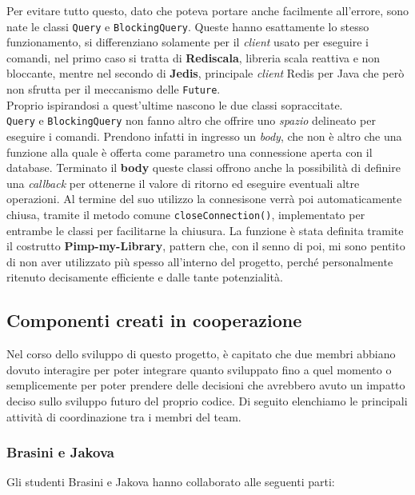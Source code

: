           Per evitare tutto questo, dato che poteva portare anche facilmente all'errore, sono nate le classi \texttt{Query} e \texttt{BlockingQuery}. Queste hanno esattamente lo stesso funzionamento, si differenziano solamente per il \textit{client} usato per eseguire i comandi, nel primo caso si tratta di \textbf{Rediscala}, libreria scala reattiva e non bloccante, mentre nel secondo di \textbf{Jedis}, principale \textit{client} Redis per Java che però non sfrutta per il meccanismo delle \texttt{Future}.
          \\
          Proprio ispirandosi a quest'ultime nascono le due classi sopraccitate. \\
          \texttt{Query} e \texttt{BlockingQuery} non fanno altro che offrire uno \textit{spazio} delineato per eseguire i comandi. Prendono infatti in ingresso un \textit{body}, che non è altro che una funzione alla quale è offerta come parametro una connessione aperta con il database. Terminato il \textbf{body} queste classi offrono anche la possibilità di definire una \textit{callback} per ottenerne il valore di ritorno ed eseguire eventuali altre operazioni.
          Al termine del suo utilizzo la connesisone verrà poi automaticamente chiusa, tramite il metodo comune \texttt{closeConnection()}, implementato per entrambe le classi per facilitarne la chiusura.
          La funzione è stata definita tramite il costrutto \textbf{Pimp-my-Library}, pattern che, con il senno di poi, mi sono pentito di non aver utilizzato più spesso all'interno del progetto, perché personalmente ritenuto decisamente efficiente e dalle tante potenzialità.








      \clearpage


        \subsection{Componenti creati in cooperazione}\label{subsec:cooperation}
        Nel corso dello sviluppo di questo progetto, è capitato che due membri abbiano dovuto interagire per poter integrare quanto sviluppato fino a quel momento o semplicemente per poter prendere delle decisioni che avrebbero avuto un impatto deciso sullo sviluppo futuro del proprio codice. Di seguito elenchiamo le principali attività di coordinazione tra i membri del team.


        \subsubsection{Brasini e Jakova}\label{subsub:cooperation:brasinijakova}
        Gli studenti Brasini e Jakova hanno collaborato alle seguenti parti:

